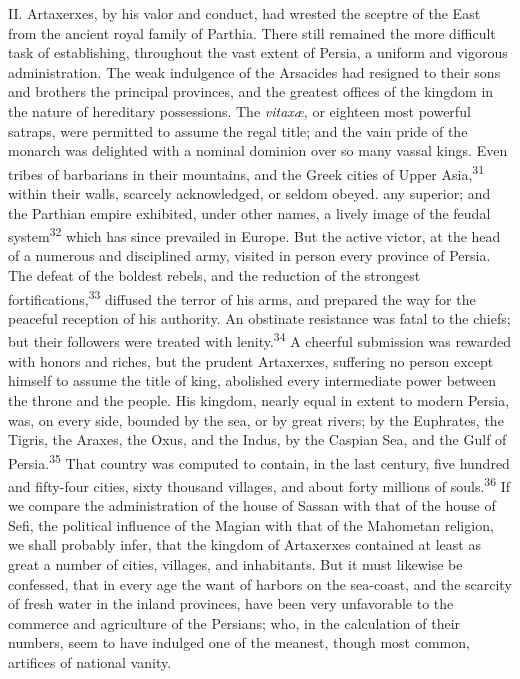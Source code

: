 II. Artaxerxes, by his valor and conduct, had wrested the sceptre
of the East from the ancient royal family of Parthia. There still
remained the more difficult task of establishing, throughout the
vast extent of Persia, a uniform and vigorous administration. The
weak indulgence of the Arsacides had resigned to their sons and
brothers the principal provinces, and the greatest offices of the
kingdom in the nature of hereditary possessions. The \textit{vitaxæ}, or
eighteen most powerful satraps, were permitted to assume the
regal title; and the vain pride of the monarch was delighted with
a nominal dominion over so many vassal kings. Even tribes of
barbarians in their mountains, and the Greek cities of Upper
Asia,\textsuperscript{31} within their walls, scarcely acknowledged, or seldom
obeyed. any superior; and the Parthian empire exhibited, under
other names, a lively image of the feudal system\textsuperscript{32} which has
since prevailed in Europe. But the active victor, at the head of
a numerous and disciplined army, visited in person every province
of Persia. The defeat of the boldest rebels, and the reduction of
the strongest fortifications,\textsuperscript{33} diffused the terror of his arms,
and prepared the way for the peaceful reception of his authority.
An obstinate resistance was fatal to the chiefs; but their
followers were treated with lenity.\textsuperscript{34} A cheerful submission was
rewarded with honors and riches, but the prudent Artaxerxes,
suffering no person except himself to assume the title of king,
abolished every intermediate power between the throne and the
people. His kingdom, nearly equal in extent to modern Persia,
was, on every side, bounded by the sea, or by great rivers; by
the Euphrates, the Tigris, the Araxes, the Oxus, and the Indus,
by the Caspian Sea, and the Gulf of Persia.\textsuperscript{35} That country was
computed to contain, in the last century, five hundred and
fifty-four cities, sixty thousand villages, and about forty
millions of souls.\textsuperscript{36} If we compare the administration of the
house of Sassan with that of the house of Sefi, the political
influence of the Magian with that of the Mahometan religion, we
shall probably infer, that the kingdom of Artaxerxes contained at
least as great a number of cities, villages, and inhabitants. But
it must likewise be confessed, that in every age the want of
harbors on the sea-coast, and the scarcity of fresh water in the
inland provinces, have been very unfavorable to the commerce and
agriculture of the Persians; who, in the calculation of their
numbers, seem to have indulged one of the meanest, though most
common, artifices of national vanity.

